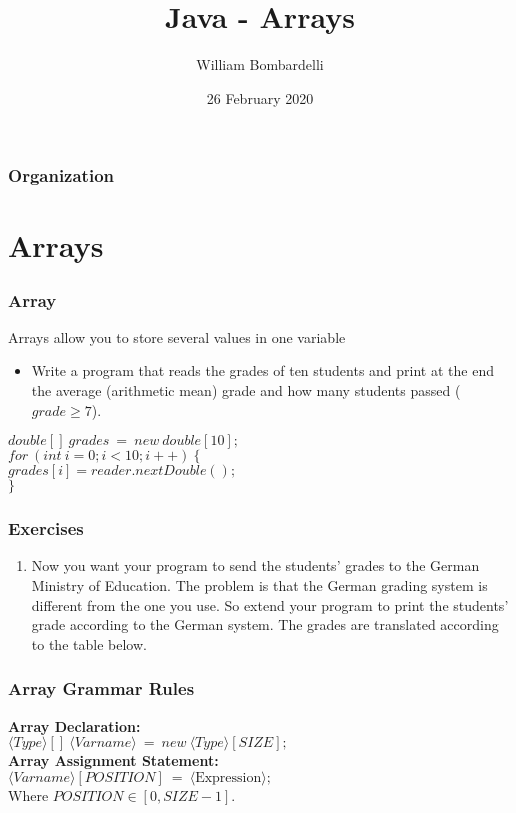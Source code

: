 \documentclass{beamer}
\title[Java]{Java - Arrays}
\author[W. Bombardelli]{William Bombardelli}
\institute[Schweizerschule Mexiko]
{
	\vskip 12pt
	Schweizerschule Mexiko, Ciudad de México, Mexico \\
	\texttt{\url{https://github.com/wbombardellis/java-unterricht}}
}
\date{26 February 2020}
\newcommand{\cindent}{\hskip20pt}
\begin{document}
	\begin{frame}
		\titlepage
	\end{frame}
	
	\begin{frame}
		\frametitle{Organization}
		\tableofcontents
	\end{frame}

	\section{Arrays}
	\begin{frame}
		\frametitle{Array}
		Arrays allow you to store several values in one variable
		\pause
		\begin{itemize}
			\item Write a program that reads the grades of ten students and print at the end the average (arithmetic mean) grade and how many students passed ($grade \ge 7$).
		\end{itemize}
		\pause
		$double[]\ grades\ =\ new\ double[10];$\\
		$for\ (int\ i = 0; i < 10; i++)\ \{$\\
			\cindent $grades[i] = reader.nextDouble();$\\
		$\}$\\
	\end{frame}

	\begin{frame}
		\frametitle{Exercises}
		\begin{enumerate}
			\item Now you want your program to send the students' grades to the German Ministry of Education. The problem is that the German grading system is different from the one you use. So extend your program to print the students' grade according to the German system. The grades are translated according to the table below.
		\end{enumerate}
	\end{frame}

	\begin{frame}
		\frametitle{Array Grammar Rules}
		\textbf{Array Declaration:}\\
		$\langle Type \rangle []\ \langle Varname \rangle\ =\ new\ \langle Type \rangle [SIZE];$\\
		\vskip20pt
		\textbf{Array Assignment Statement:}\\
		$\langle Varname \rangle [POSITION]\ =\ \langle \text{Expression}\rangle;$\\
		Where $POSITION \in [0, SIZE-1]$.
	\end{frame}
\end{document}
